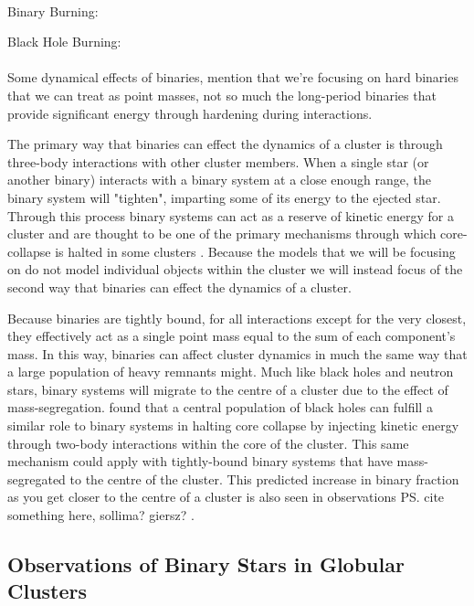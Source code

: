 \paragraph{}
Binary Burning: \citet{Chatterjee2013}


Black Hole Burning: \citet{Kremer2019}
\paragraph{}


Some dynamical effects of binaries, mention that we're focusing on hard binaries that we can treat
as point masses, not so much the long-period binaries that provide significant energy through
hardening during interactions.

The primary way that binaries can effect the dynamics of a cluster is through three-body
interactions with other cluster members. When a single star (or another binary) interacts with a
binary system at a close enough range, the binary system will "tighten", imparting some of its
energy to the ejected star. Through this process binary systems can act as a reserve of kinetic
energy for a cluster and are thought to be one of the primary mechanisms through which core-collapse
is halted in some clusters \citep{Chatterjee2013}. Because the models that we will be focusing on do
not model individual objects within the cluster we will instead focus of the second way that
binaries can effect the dynamics of a cluster.

Because binaries are tightly bound, for all interactions except for the very closest, they
effectively act as a single point mass equal to the sum of each component's mass. In this way,
binaries can affect cluster dynamics in much the same way that a large population of heavy remnants
might. Much like black holes and neutron stars, binary systems will migrate to the centre of a
cluster due to the effect of mass-segregation. \citet{Kremer2019} found that a central population of
black holes can fulfill a similar role to binary systems in halting core collapse by injecting
kinetic energy through two-body interactions within the core of the cluster. This same mechanism
could apply with tightly-bound binary systems that have mass-segregated to the centre of the
cluster. This predicted increase in binary fraction as you get closer to the centre of a cluster is
also seen in observations \ps{cite something here, sollima? giersz? }.

\subsection{Observations of Binary Stars in Globular Clusters}

